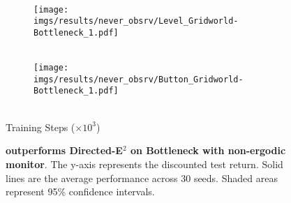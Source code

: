 \begin{figure}[bth]
    \begin{subfigure}[b]{0.16\textwidth}
        \centering
        \\
        \texttt{[image: imgs/results/never\_obsrv/Level\_Gridworld-Bottleneck\_1.pdf]}
    \end{subfigure} 
    \hfill
    \begin{subfigure}[b]{0.16\textwidth}
        \centering
        \\[-1.5pt]
        \texttt{[image: imgs/results/never\_obsrv/Button\_Gridworld-Bottleneck\_1.pdf]}
    \end{subfigure}
    \\[-1.5pt]
    {\scriptsize{Training Steps ($\times 10^3$)}}
    \caption{\textbf{\thealgo outperforms Directed-E$^2$ on Bottleneck with non-ergodic monitor}. The y-axis represents the discounted test return. Solid lines are the average performance across 30 seeds. Shaded areas represent 95\% confidence intervals.}
    \label{fig:result_new_env}
    \vspace{-15pt}
\end{figure}
%
%
%